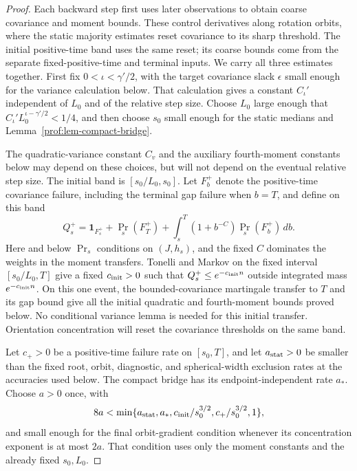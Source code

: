 \begin{proof}
Each backward step first uses later observations to obtain coarse
covariance and moment bounds. These control derivatives along rotation
orbits, where the static majority estimates reset covariance to its sharp
threshold. The initial positive-time band uses the same reset; its coarse
bounds come from the separate fixed-positive-time and terminal inputs.
We carry all three estimates together. First fix
\(0<\iota<\gamma'/2\), with the target covariance slack
\(\epsilon\) small enough for the variance calculation below.
That calculation gives a constant \(C_\iota'\) independent of
\(L_0\) and of the relative step size. Choose \(L_0\) large enough
that \(C_\iota'L_0^{\iota-\gamma'/2}<1/4\), and then choose
\(s_0\) small enough for the static medians and
Lemma~\ref{prof:lem-compact-bridge}.

The quadratic-variance constant
\(C_v\) and the auxiliary fourth-moment constants below may depend on
these choices, but will not depend on the eventual relative step size.
The initial band is \([s_0/L_0,s_0]\). Let \(F_b^+\) denote the
positive-time covariance failure, including the terminal gap failure
when \(b=T\), and define on this band
\[
 Q_s^+=\mathbf1_{F_s^+}+\Pr_s(F_T^+)
       +\int_s^T(1+b^{-C})\Pr_s(F_b^+)\,db.
\]
Here and below \(\Pr_s\) conditions on \((J,h_s)\), and the fixed
\(C\) dominates the weights in the moment transfers. Tonelli and
Markov on the fixed interval \([s_0/L_0,T]\) give a fixed
\(c_{\rm init}>0\) such that \(Q_s^+\le e^{-c_{\rm init}n}\)
outside integrated mass \(e^{-c_{\rm init}n}\). On this one event,
the bounded-covariance martingale transfer to \(T\) and its gap
bound give all the initial quadratic and fourth-moment bounds proved
below. No conditional variance lemma is needed for this initial
transfer. Orientation concentration will reset the covariance
thresholds on the same band.

Let \(c_+>0\) be a positive-time failure rate on \([s_0,T]\),
and let \(a_{\rm stat}>0\) be smaller than the fixed root,
orbit, diagnostic, and spherical-width exclusion rates at the
accuracies used below. The compact bridge has its endpoint-independent
rate \(a_*\). Choose \(a>0\) once, with
\[
 8a<\min\{a_{\rm stat},a_*,
          c_{\rm init}/s_0^{3/2},c_+/s_0^{3/2},1\},
\]
and small enough for the final orbit-gradient condition whenever
its concentration exponent is at most \(2a\). That condition uses
only the moment constants and the already fixed \(s_0,L_0\).


\end{proof}
